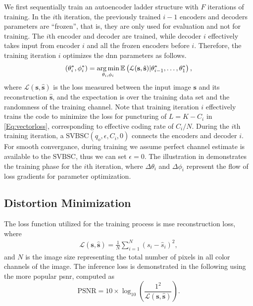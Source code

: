 We first sequentially train an autoencoder ladder structure with $F$ iterations of  training. In the $i$th iteration, the previously trained $i-1$ encoders and decoders parameters  are ``frozen'', that is, they are only used for evaluation and not for training. The $i$th encoder and decoder are trained, while decoder $i$ effectively takes input from encoder $i$ and all the frozen encoders before $i$. Therefore, the training iteration $i$ optimizes the \gls{dnn} parameters as follows. 
\begin{align}\label{eq:opt}
(\theta^*_i, \phi^*_i) = \operatorname*{arg\,min}_{\theta_i, \phi_i} \mathbb{E} \left( \mathcal{L}({\mathbf{s}},\hat{\mathbf{s}}) | \theta^*_{i-1}, \ldots, \theta^*_1 \right),
\end{align}
where $\mathcal{L}({\mathbf{s}},\hat{\mathbf{s}})$ is the  loss measured between the input image $\mathbf{s}$ and its reconstruction $\hat{\mathbf{s}}$, and the expectation is over the training data set and the randomness of the training channel. Note that training iteration $i$ effectively trains the code to minimize the loss  for  puncturing of $L = K - C_i$ in \eqref{Eq:vectorloss}, corresponding to effective coding rate  of $C_i / N$. During the $i$th training iteration, a $\text{SVBSC}(q_o,\epsilon, C_i, 0)$ connects the encoders and decoder $i$. For smooth convergance, during training we assume perfect channel estimate is available to the $\text{SVBSC}$, thus we can set $\epsilon = 0$. The illustration in  demonstrates the training phase for the $i$th iteration, where $\Delta{\theta_i}$ and $\Delta{\phi_i}$ represent the flow of loss gradients for parameter optimization.






\subsection{Distortion Minimization}


The loss function utilized for the training process is \gls{mse} reconstruction loss, where
\begin{align}
\mathcal{L}({\mathbf{s}},\hat{\mathbf{s}}) = \frac{1}{N} \sum_{i=1}^{N} \left( s_i - \hat{s}_i \right)^2,
\end{align}
and $N$ is the image size representing the total number of pixels in all  color channels of the image. The inference loss is demonstrated in the following  using the more popular  \gls{psnr}, computed as
\[
\text{PSNR} = 10 \times \log_{10}\left(\frac{\text{1}^2}{\mathcal{L}({\mathbf{s}},\hat{\mathbf{s}})}\right).
\]



